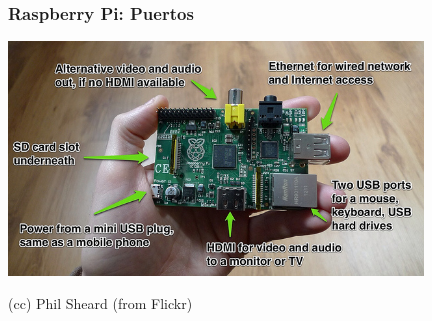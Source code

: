 
\begin{frame}
\frametitle{Raspberry Pi: Puertos}

\begin{center}
  \includegraphics[width=11cm]{figs/raspberry2.jpg}
\end{center}


\begin{flushright}
{\tiny
(cc) Phil Sheard (from Flickr)
}
\end{flushright}

\end{frame}


